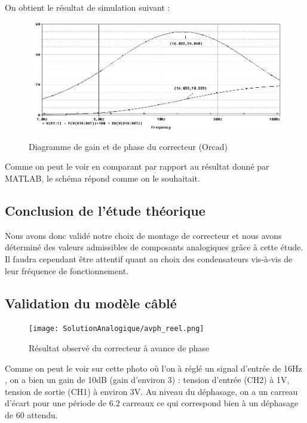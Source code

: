\documentclass[11pt, french]{article} %
\begin{document}
On obtient le résultat de simulation suivant : 

\begin{figure}[!h]
    \centering
	\includegraphics[width = 15cm]{SolutionAnalogique/orcad_simu.png} 
	\label{avph_schm_simu_res}
	\caption{Diagramme de gain et de phase du correcteur (Orcad)}
\end{figure}


Comme on peut le voir en comparant par rapport au résultat donné par MATLAB, le schéma répond comme on le souhaitait. 

\vspace{0.5cm}
\subsection{Conclusion de l'étude théorique}

\noindent
Nous avons donc validé notre choix de montage de correcteur et nous avons déterminé des valeurs admissibles de composants analogiques grâce à cette étude. Il faudra cependant être attentif quant au choix des condensateurs vis-à-vis de leur fréquence de fonctionnement.  

\subsection{Validation du modèle câblé}

\begin{figure}[!h]
    \centering
	\texttt{[image: SolutionAnalogique/avph\_reel.png]} 
	\label{avph_reel}
	\caption{Résultat observé du correcteur à avance de phase}
\end{figure}

Comme on peut le voir sur cette photo où l'on à réglé un signal d'entrée de 16Hz , on a bien un gain de 10dB (gain d'environ 3) : tension d'entrée (CH2) à 1V, tension de sortie (CH1) à environ 3V. Au niveau du déphasage, on a un carreau d'écart pour une période de 6.2 carreaux ce qui correspond bien à un déphasage de 60 attendu. 
\end{document}
